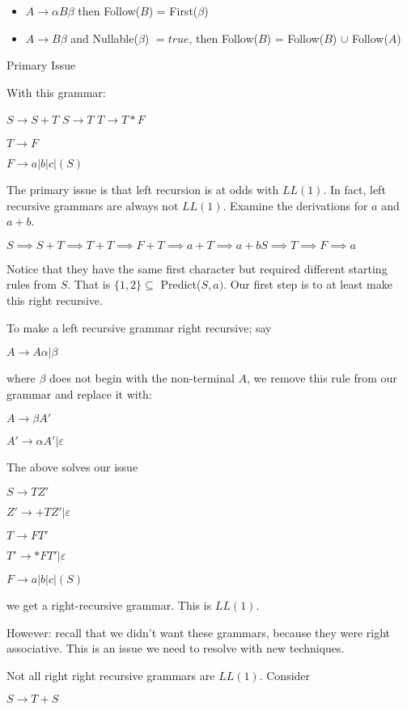 \documentclass{article}
\begin{document}
\begin{itemize}
    \item \(A \to \alpha B \beta\) then Follow(\(B\)) = First(\(\beta\))
    \item \(A \to B \beta\) and Nullable(\(\beta\)) \(= true\), then
Follow(\(B\)) = Follow(\(B\)) \(\cup\) Follow(\(A\))
\end{itemize}

Primary Issue

With this grammar:

\(S \to S + T\) \(S \to T\) \(T \to T * F\)

\(T \to F\)

\(F \to a | b | c | (S)\)

The primary issue is that left recursion is at odds with \(LL(1)\). In
fact, left recursive grammars are always not \(LL(1)\). Examine the
derivations for \(a\) and \(a + b\).

\(S \implies S + T \implies T + T \implies F + T \implies a + T \implies a + b S \implies T \implies F \implies a\)

Notice that they have the same first character but required different
starting rules from \(S\). That is \(\{1,2\} \subseteq\)
Predict(\(S, a)\). Our first step is to at least make this right
recursive.

To make a left recursive grammar right recursive; say

\(A \to A \alpha | \beta\)

where \(\beta\) does not begin with the non-terminal \(A\), we remove
this rule from our grammar and replace it with:

\(A \to \beta A'\)

\(A' \to \alpha A' | \varepsilon\)

The above solves our issue

\(S \to T Z'\)

\(Z' \to +TZ' | \varepsilon\)

\(T \to F T'\)

\(T' \to * FT' | \varepsilon\)

\(F \to a | b | c | (S)\)

we get a right-recursive grammar. This is \(LL(1)\).

However: recall that we didn't want these grammars, because they were
right associative. This is an issue we need to resolve with new
techniques.

Not all right right recursive grammars are \(LL(1)\). Consider

\(S \to T + S\)
\end{document}
